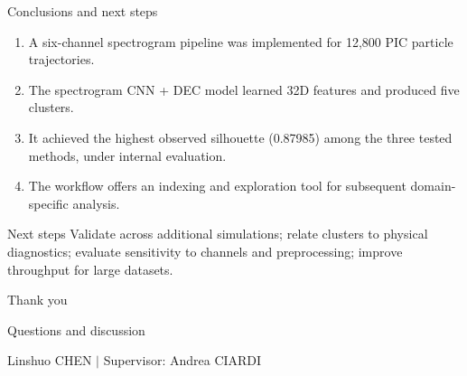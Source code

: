 \documentclass[aspectratio=169,11pt]{beamer}
\begin{document}
\begin{frame}{Conclusions and next steps}
  \begin{enumerate}
    \item A six-channel spectrogram pipeline was implemented for 12,800 PIC particle trajectories.
    \item The spectrogram CNN + DEC model learned 32D features and produced five clusters.
    \item It achieved the highest observed silhouette (0.87985) among the three tested methods, under internal evaluation.
    \item The workflow offers an indexing and exploration tool for subsequent domain-specific analysis.
  \end{enumerate}
  \vspace{0.45em}
  \begin{alertblock}{Next steps}
    Validate across additional simulations; relate clusters to physical diagnostics; evaluate sensitivity to channels and preprocessing; improve throughput for large datasets.
  \end{alertblock}
\end{frame}

\begin{frame}[plain]
  \vfill
  \centering
  {\Huge\color{SorbonneNavy}Thank you}\par
  \vspace{1em}
  {\Large Questions and discussion}\par
  \vfill
  {\small Linshuo CHEN \quad $\vert$ \quad Supervisor: Andrea CIARDI}
\end{frame}
\end{document}
